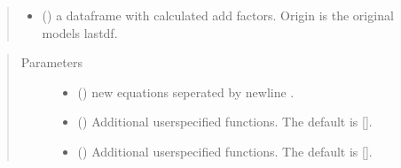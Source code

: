 \documentclass[letterpaper,10pt,english]{sphinxmanual}
\begin{document}
\begin{fulllineitems}
\begin{fulllineitems}
\begin{quote}
\begin{description}
\begin{itemize}
\item {} 
\sphinxAtStartPar
{} () \textendash{} a dataframe with calculated add factors. Origin is the original models lastdf.

\end{itemize}


\end{description}\end{quote}

\end{fulllineitems}


\begin{fulllineitems}
\label{\detokenize{index:modelclass.Modify_Mixin.equpdate_old}}
\pysigstartsignatures
{}
\pysigstopsignatures\begin{quote}\begin{description}
\item[{Parameters}] \leavevmode\begin{itemize}
\item {} 
\sphinxAtStartPar
{} () \textendash{} new equations seperated by newline .

\item {} 
\sphinxAtStartPar
{} (\sphinxstyleliteralemphasis{\sphinxupquote{, }}) \textendash{} Additional userspecified functions. The default is {[}{]}.

\item {} 
\sphinxAtStartPar
{} (\sphinxstyleliteralemphasis{\sphinxupquote{, }}) \textendash{} Additional userspecified functions. The default is {[}{]}.


\end{itemize}
\end{description}
\end{quote}
\end{fulllineitems}
\end{fulllineitems}
\end{document}
